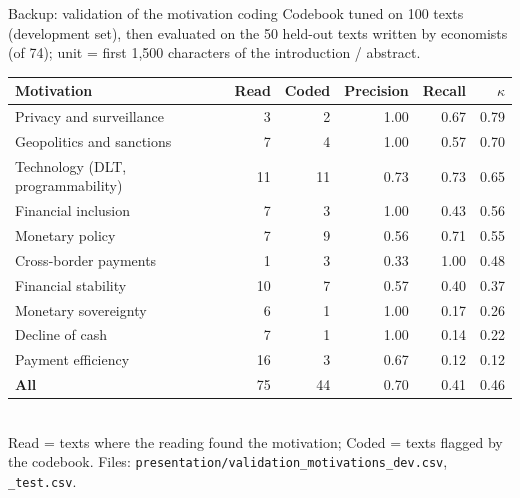 \documentclass[aspectratio=169,10pt]{beamer}
\begin{document}
\begin{frame}{Backup: validation of the motivation coding}
\footnotesize
Codebook tuned on 100 texts (development set), then evaluated on the 50 \alert{held-out} texts written by economists (of 74); unit = first 1{,}500 characters of the introduction / abstract.\\[3pt]
\begin{tabular}{@{}lrrrrr@{}}\toprule
\textbf{Motivation} & \textbf{Read} & \textbf{Coded} & \textbf{Precision} & \textbf{Recall} & $\kappa$\\\midrule
Privacy and surveillance & 3 & 2 & 1.00 & 0.67 & 0.79 \\
Geopolitics and sanctions & 7 & 4 & 1.00 & 0.57 & 0.70 \\
Technology (DLT, programmability) & 11 & 11 & 0.73 & 0.73 & 0.65 \\
Financial inclusion & 7 & 3 & 1.00 & 0.43 & 0.56 \\
Monetary policy & 7 & 9 & 0.56 & 0.71 & 0.55 \\
Cross-border payments & 1 & 3 & 0.33 & 1.00 & 0.48 \\
Financial stability & 10 & 7 & 0.57 & 0.40 & 0.37 \\
Monetary sovereignty & 6 & 1 & 1.00 & 0.17 & 0.26 \\
Decline of cash & 7 & 1 & 1.00 & 0.14 & 0.22 \\
Payment efficiency & 16 & 3 & 0.67 & 0.12 & 0.12 \\
\midrule
\textbf{All} & 75 & 44 & 0.70 & 0.41 & 0.46 \\
\bottomrule\end{tabular}\\[3pt]
\scriptsize Read = texts where the reading found the motivation; Coded = texts flagged by the codebook. Files: \texttt{presentation/validation\_motivations\_dev.csv}, \texttt{\_test.csv}.
\end{frame}
\end{document}
